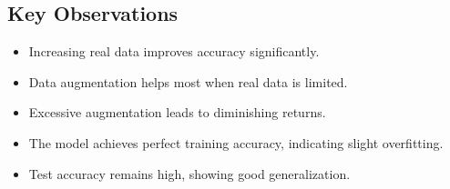 \documentclass[12pt,a4paper]{article}
\begin{document}
\subsection{Key Observations}

\begin{itemize}
\item Increasing real data improves accuracy significantly.
\item Data augmentation helps most when real data is limited.
\item Excessive augmentation leads to diminishing returns.
\item The model achieves perfect training accuracy, indicating slight overfitting.
\item Test accuracy remains high, showing good generalization.
\end{itemize}
\end{document}
